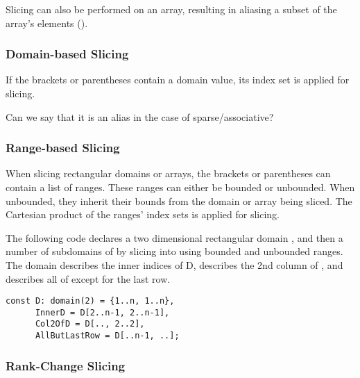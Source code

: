 Slicing can also be performed on an array,
resulting in aliasing a subset of the array's elements
().

\subsubsection{Domain-based Slicing}

If the brackets or parentheses contain a domain value,
its index set is applied for slicing.

\begin{openissue}
Can we say that it is an alias in the case of sparse/associative?
\end{openissue}

\subsubsection{Range-based Slicing}
\label{Range_Based_Slicing}
When slicing rectangular domains or arrays, the brackets or parentheses
can contain a list of  ranges.  These ranges can either be bounded
or unbounded.
%
When unbounded, they inherit their bounds from the
domain or array being sliced.
%
The Cartesian product of the ranges' index sets is applied for slicing.

\begin{example}
The following code declares a two dimensional rectangular
domain , and then a number of subdomains of  by
slicing into  using bounded and unbounded ranges.
The  domain describes the inner indices of
D,  describes the 2nd column of
, and  describes all of  except
for the last row.

\begin{chapel}
\begin{verbatim}
const D: domain(2) = {1..n, 1..n},
      InnerD = D[2..n-1, 2..n-1],
      Col2OfD = D[.., 2..2],
      AllButLastRow = D[..n-1, ..];
\end{verbatim}
\end{chapel}
\end{example}

\subsubsection{Rank-Change Slicing}
\label{Rank_Change_Slicing}

